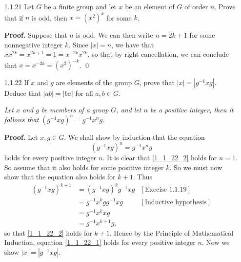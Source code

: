 \begin{enumerate}
      \textbf{Case 2.} \textit{$|x| = \infty$}. Suppose to the contrary that
      $|x^{-1}| = n \in \Z^+$. As we argued in Case 1, it must be the case that
      $x^n = 1$, a contradiction. Thus $|x| = \infty = |x^{-1}|$. \qed
   \item[1.1.21]  Let $G$ be a finite group and let $x$ be an element of $G$ of
                  order $n$. Prove that if $n$ is odd, then $x = (x^2)^k$ for
                  some $k$.

      \textbf{Proof.} Suppose that $n$ is odd. We can then write $n = 2k + 1$
      for some nonnegative integer $k$. Since $|x| = n$, we have that
      $xx^{2k} = x^{2k+1} = 1 = x^{-2k}x^{2k}$, so that by right cancellation,
      we can conclude that $x = x^{-2k} = (x^2)^{-k}$. \qed
   \item[1.1.22]  If $x$ and $g$ are elements of the group $G$, prove that
                  $|x| = |g^{-1}xg|$. Deduce that $|ab| = |ba|$ for all
                  $a, b \in G$.

      \begin{lemma} \label{1_1_22_1} \textit{Let $x$ and $g$ be members of a 
                  group $G$, and let $n$ be a positive integer, then it follows 
                  that $(g^{-1}xg)^n = g^{-1}x^ng$.}
      \end{lemma}

      \textbf{Proof.} Let $x, g \in G$. We shall show by induction that the 
      equation
      \begin{equation}
         (g^{-1}xg)^n = g^{-1}x^ng \label{1_1_22_2}
      \end{equation}
      holds for every positive integer $n$. It is clear that \eqref{1_1_22_2} 
      holds for $n = 1$. So assume that it also holds for some positive integer 
      $k$. So we must now show that the equation also holds for $k + 1$. Thus
      \begin{align*}
         (g^{-1}xg)^{k+1} &= (g^{-1}xg)^kg^{-1}xg &[\text{Execise 1.1.19}] \\
                     &= g^{-1}x^kgg^{-1}xg &[\text{Inductive hypothesis}] \\
                     &= g^{-1}x^kxg \\
                     &= g^{-1}x^{k+1}g,
      \end{align*}
      so that \eqref{1_1_22_2} holds for $k+1$. Hence by the Principle 
      of Mathematical Induction, equation \eqref{1_1_22_1} holds for every 
      positive integer $n$. Now we show $|x| = |g^{-1}xg|$.


\end{enumerate}
